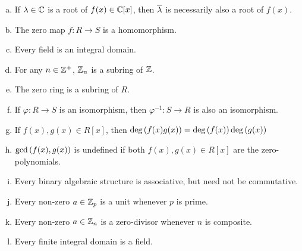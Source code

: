 \documentclass[11pt]{exam}
\begin{document}
\begin{questions}
\begin{enumerate}[(a)]
\item \underline{\hspace{1cm}} If $\lambda\in \mathbb{C}$ is a root of $f(x)\in\mathbb{C}[x]$, then $\overline{\lambda}$ is necessarily also a root of $f(x)$.
\vsp

\item \underline{\hspace{1cm}} The zero map $f:R\to S$ is a homomorphism.
\vsp

\item \underline{\hspace{1cm}} Every field is an integral domain.
\vsp

\item \underline{\hspace{1cm}} For any $n\in\mathbb{Z}^{+}$, $\mathbb{Z}_{n}$ is a subring of $\mathbb{Z}$.
\vsp

\item \underline{\hspace{1cm}} The zero ring is a subring of $R$.
\vsp

\item \underline{\hspace{1cm}} If $\varphi:R\to S$ is an isomorphism, then $\varphi^{-1}:S\to R$ is also an isomorphism.
\vsp

\item \underline{\hspace{1cm}} If $f(x),g(x)\in R[x]$, then $\text{deg}\left(f(x)g(x)\right) = \text{deg}\left(f(x)\right)\text{deg}\left(g(x)\right)$
\vsp

\item \underline{\hspace{1cm}} $\text{gcd}\left(f(x),g(x)\right)$ is undefined if both $f(x), g(x)\in R[x]$ are the zero-polynomials.
\vsp

\item \underline{\hspace{1cm}} Every binary algebraic structure is associative, but need not be commutative.
\vsp

\item \underline{\hspace{1cm}} Every non-zero $a\in\mathbb{Z}_{p}$ is a unit whenever $p$ is prime.
\vsp

\item \underline{\hspace{1cm}} Every non-zero $a\in\mathbb{Z}_{n}$ is a zero-divisor whenever $n$ is composite.
\vsp

\item \underline{\hspace{1cm}} Every finite integral domain is a field.
\vsp


\end{enumerate}
\end{questions}
\end{document}
